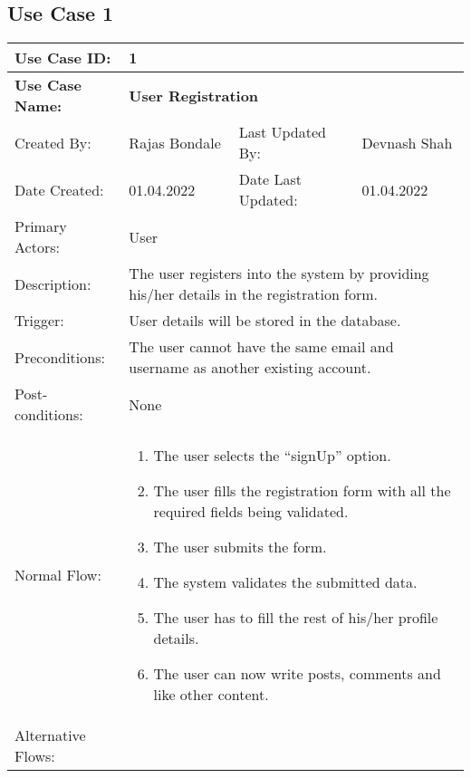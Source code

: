 \documentclass[12pt]{article}
\begin{document}
\subsection{Use Case 1}
\begin{center}
    \begin{longtable}{ | p{3cm} | p{3cm} | p{3cm} | p{3cm} | }
        \hline
        \textbf{Use Case ID:} & \multicolumn{3}{l|}{\textbf{1}} \\
        \hline
        \textbf{Use Case Name:} & \multicolumn{3}{l|}{\textbf{User Registration}}\\
        \hline
         Created By: & Rajas Bondale & Last Updated By: & Devnash Shah \\
        \hline
        Date Created: & 01.04.2022 & Date Last Updated: & 01.04.2022 \\
        \hline
        Primary Actors: & \multicolumn{3}{l|}{User}\\
        \hline
        Description: & \multicolumn{3}{p{9cm}|}{The user registers into the system by providing his/her details in the registration form.}\\
        \hline
        Trigger: & \multicolumn{3}{p{9cm}|}{User details will be stored in the database. }\\
        \hline
        Preconditions: & \multicolumn{3}{p{9cm}|}{The user cannot have the same email and username as another existing account. }\\
        \hline
        Post-conditions: & \multicolumn{3}{p{9cm}|}{None}\\
        \hline
        Normal Flow: & \multicolumn{3}{p{9cm}|}{
            \begin{enumerate}
                \item The user selects the “signUp” option.
                \item The user fills the registration form with all the required fields being validated.
                \item The user submits the form.
                \item The system validates the submitted data.
	     \item The user has to fill the rest of his/her profile details.
                \item The user can now write posts, comments and like other content.
            \end{enumerate}
        }\\
        \hline
        Alternative Flows: & \multicolumn{3}{p{9cm}|}{
}
\end{longtable}
\end{center}
\end{document}
